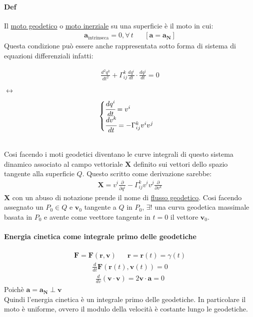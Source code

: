 \paragraph*{Def} Il \underline{moto geodetico} o \underline{moto inerziale} su una superficie è il moto in cui:
\begin{align*}
    \mathbf{a}_{\text{intrinseca}}=0, \forall \, t && [\mathbf{a} = \mathbf{a}_{\mathbf{N}}]
\end{align*}
Questa condizione può essere anche rappresentata sotto forma di sistema di equazioni differenziali infatti:\\
\begin{minipage}{4cm}
    \begin{align*}
        \frac{d^2q^k}{dt^2}+\Gamma^k_{ij}\frac{dq^i}{dt}\cdot \frac{dq^j}{dt}=0
    \end{align*}
\end{minipage}$\longleftrightarrow$
\begin{minipage}{4cm}
    \begin{align*}
        \begin{cases}
            \cfrac{dq^i}{dt}=v^i\\
            \cfrac{dv^k}{dt}=-\Gamma^k_{ij}v^iv^j
        \end{cases}
    \end{align*}
\end{minipage}
\\
Cosi facendo i moti geodetici diventano le curve integrali di questo sistema dinamico associato al campo vettoriale $\mathbf{X}$ definito sui vettori dello spazio tangente alla superficie $Q$. Questo scritto come derivazione sarebbe:
\begin{align*}
    \mathbf{X}=v^i\frac{\partial}{\partial q^i}-\Gamma^k_{ij}v^iv^j\frac{\partial}{\partial v^k}
\end{align*}
$\mathbf{X}$ con un abuso di notazione prende il nome di \underline{flusso geodetico}.
Cosi facendo assegnato un $P_0\in Q$ e $\mathbf{v}_0$ tangente a $Q$ in $P_0$, $\exists!$ una curva geodetica massimale basata in $P_0$ e avente come veettore tangente in $t=0$ il vettore $\mathbf{v}_0$.
\paragraph*{Energia cinetica come integrale primo delle geodetiche}
\begin{align*}
    \mathbf{F}=\mathbf{F}(\mathbf{r},\mathbf{v}) && \mathbf{r}=\mathbf{r}(t)=\gamma(t)
\end{align*}
\begin{align*}
    \frac{d}{dt}\mathbf{F}(\mathbf{r}(t),\mathbf{v}(t))=0
\end{align*}
\begin{align*}
    \frac{d}{dv}(\mathbf{v}\cdot \mathbf{v})=2\mathbf{v}\cdot\mathbf{a}=0
\end{align*}
Poichè $\mathbf{a}=\mathbf{a}_{\mathbf{N}}\perp \mathbf{v}$\\
Quindi l'energia cinetica è un integrale primo delle geodetiche. In particolare il moto è uniforme, ovvero il modulo della velocità è costante lungo le geodetiche.
